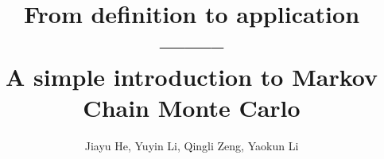 \documentclass[10pt,journal]{IEEEtran}
\begin{document}
%
\title{From definition to application -------- \\A simple introduction to Markov Chain Monte Carlo}
%
%
%
%

\author{Jiayu He, Yuyin Li, Qingli Zeng, Yaokun Li

}

% 
%
\end{document}
